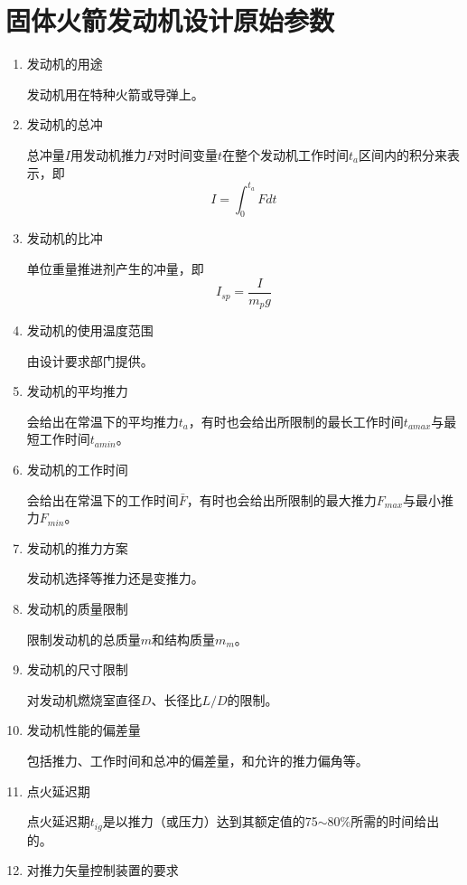 \section{固体火箭发动机设计原始参数}
\begin{enumerate}[leftmargin=2em]
  \item 发动机的用途
  
  发动机用在特种火箭或导弹上。
  \item 发动机的总冲
  
  总冲量$I$用发动机推力$F$对时间变量$t$在整个发动机工作时间$t_{a}$区间内的积分来表示，即
  \[
    I=\int_{0}^{t_{a}} Fdt
  \]
  \item 发动机的比冲
  
  单位重量推进剂产生的冲量，即
  \[
    I_{sp}=\frac{I}{m_{p}g} 
  \]
  \item 发动机的使用温度范围
  
  由设计要求部门提供。

  \item 发动机的平均推力
  
  会给出在常温下的平均推力$t_{a}$，有时也会给出所限制的最长工作时间$t_{amax}$与最短工作时间$t_{amin}$。

  \item 发动机的工作时间
  
  会给出在常温下的工作时间$\bar{F} $，有时也会给出所限制的最大推力$F_{max}$与最小推力$F_{min}$。

  \item 发动机的推力方案
  
  发动机选择等推力还是变推力。

  \item 发动机的质量限制
  
  限制发动机的总质量$m$和结构质量$m_{m}$。

  \item 发动机的尺寸限制
  
  对发动机燃烧室直径$D$、长径比$L/D$的限制。

  \item 发动机性能的偏差量
  
  包括推力、工作时间和总冲的偏差量，和允许的推力偏角等。

  \item 点火延迟期
  
  点火延迟期$t_{ig}$是以推力（或压力）达到其额定值的75$\sim$80\%所需的时间给出的。

  \item 对推力矢量控制装置的要求
  

\end{enumerate}
